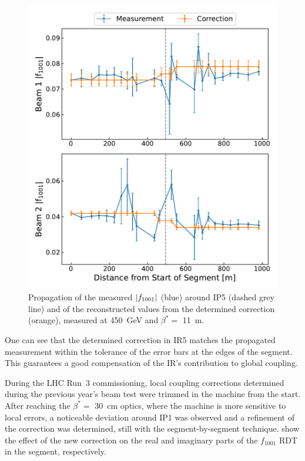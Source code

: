 \begin{figure}[!htb]
    \centering
    \includegraphics*[width=\textwidth]{Figures/IR_Coupling_Correction/beamtest_sbs_abs_f1001_ip5.pdf}
    \caption{Propagation of the measured \(\left\lvert f_{1001} \right\rvert\) (\textcolor{mplblue}{blue}) around IP\num{5} (dashed grey line) and of the reconstructed values from the determined correction (\textcolor{mplorange}{orange}), measured at \qty{450}{\giga\electronvolt} and \(\beta^{*}=\) \qty{11}{\meter}.}
    \label{figure:beam_test_sbs_abs_f1001_ip5}
\end{figure}

One can see that the determined correction in IR\num{5} matches the propagated measurement within the tolerance of the error bars at the edges of the segment.
This guarantees a good compensation of the IR's contribution to global coupling.

During the LHC Run~\num{3} commissioning, local coupling corrections determined during the previous year's beam test were trimmed in the machine from the start.
After reaching the \(\beta^{*}=\) \qty{30}{\centi\meter} optics, where the machine is more sensitive to local errors, a noticeable deviation around IP\num{1} was observed and a refinement of the correction was determined, still with the segment-by-segment technique.
 show the effect of the new correction on the real and imaginary parts of the \(f_{1001}\) RDT in the segment, respectively.

